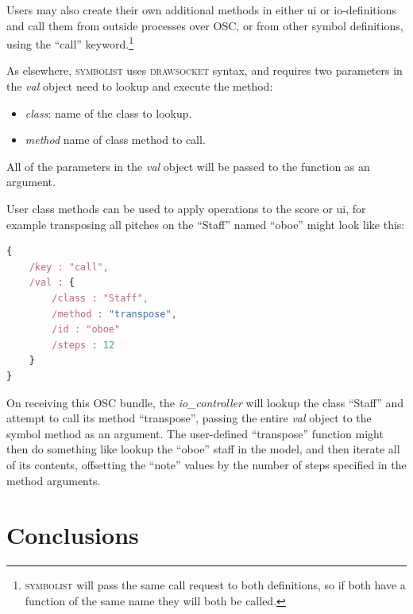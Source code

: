 \documentclass{article}
\def\symbolist{\textsc{symbolist}\xspace}
\def\drawsocket{\textsc{drawsocket}\xspace}
\def\iocontroller{\textit{io\_controller}\xspace}
\def\oscfontsize{\tiny}
\begin{document}
Users may also create their own additional methods in either ui or io-definitions and call them from outside processes over OSC, or from other symbol definitions, using the ``call'' keyword.\footnote{\symbolist will pass the same call request to both definitions, so if both have a function of the same name they will both be called.}

As elsewhere, \symbolist uses \drawsocket syntax, and requires two parameters  in the \textit{val} object need to lookup and execute the method:

\begin{itemize}\itemsep0pt 
 \item \textit{class}: name of the class to lookup.
  \item \textit{method} name of class method to call.
\end{itemize}

All of the parameters in the \textit{val} object will be passed to the function as an argument. 

User class methods can be used to apply operations to the score or ui, for example transposing all pitches on the ``Staff'' named ``oboe'' might look like this:

\begin{lstlisting}[language=Javascript,
belowskip=-2 \baselineskip,
  mathescape,
  columns=fullflexible,
  basicstyle=\oscfontsize\fontfamily{lmvtt}\selectfont,
]
{
    /key : "call",
    /val : {
        /class : "Staff",
        /method : "transpose",
        /id : "oboe"
        /steps : 12
    }
}
\end{lstlisting}

On receiving this OSC bundle, the \iocontroller will lookup the class ``Staff'' and attempt to call its method ``transpose'', passing the entire \textit{val} object to the symbol method as an argument. The user-defined ``transpose'' function might then do something like lookup the ``oboe'' staff in the model, and then iterate all of its contents, offsetting the ``note'' values by the number of steps specified in the method arguments.


\section{Conclusions} %
 
\end{document}
